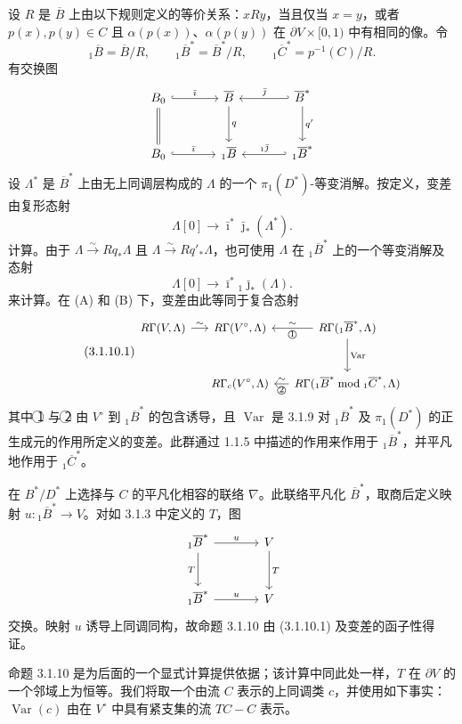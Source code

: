 设 $R$ 是 $\overline B$ 上由以下规则定义的等价关系：$xRy$，当且仅当 $x=y$，或者 $p(x),p(y)\in C$ 且 $\alpha(p(x))$、$\alpha(p(y))$ 在 $\partial V\times[0,1)$ 中有相同的像。令
\[
{}_1\overline B=\overline B/R,
\qquad
{}_1\overline B^*=\overline B^*/R,
\qquad
{}_1\overline C^*=p^{-1}(C)/R.
\]
有交换图
\[
\begin{tikzcd}[column sep=large,row sep=large]
B_0 \arrow[r,hook,"\bar\imath"] \arrow[d,equal]
  & \overline B \arrow[d,"q"]
  & \overline B^* \arrow[l,hook',"\bar\jmath"'] \arrow[d,"q'"] \\
B_0 \arrow[r,hook,"\bar\imath"]
  & {}_1\overline B
  & {}_1\overline B^* \arrow[l,hook',"{}_1\bar\jmath"']
\end{tikzcd}
\]
设 $\Lambda^*$ 是 $\overline B^*$ 上由无上同调层构成的 $\Lambda$ 的一个 $\pi_1(D^*)$-等变消解。按定义，变差由复形态射
\[
\Lambda[0]\longrightarrow
\bar\imath^*\bar\jmath_*(\Lambda^*).
\]
计算。由于 $\Lambda\xrightarrow{\sim}Rq_*\Lambda$ 且 $\Lambda\xrightarrow{\sim}Rq'_*\Lambda$，也可使用 $\Lambda$ 在 ${}_1\overline B^*$ 上的一个等变消解及态射
\[
\Lambda[0]\longrightarrow
\bar\imath^*{}_1\bar\jmath_*(\Lambda).
\]
来计算。在 (A) 和 (B) 下，变差由此等同于复合态射
\begin{equation}\tag{3.1.10.1}
\begin{tikzcd}[column sep=small,row sep=large,cells={nodes={font=\small}}]
R\Gamma(V,\Lambda) \arrow[r,"\sim"]
  & R\Gamma(V^\circ,\Lambda)
  & R\Gamma({}_1\overline B^*,\Lambda)
      \arrow[l,"\sim"',"\text{\textcircled{1}}"]
      \arrow[d,"\operatorname{Var}"] \\
{}
  & R\Gamma_c(V^\circ,\Lambda)
  & R\Gamma({}_1\overline B^*\bmod{}_1\overline C^*,\Lambda)
      \arrow[l,"\sim"',"\text{\textcircled{2}}"]
\end{tikzcd}
\end{equation}
其中 \textcircled{1} 与 \textcircled{2} 由 $V^\circ$ 到 ${}_1\overline B^*$ 的包含诱导，且 $\operatorname{Var}$ 是 3.1.9 对 ${}_1\overline B^*$ 及 $\pi_1(D^*)$ 的正生成元的作用所定义的变差。此群通过 1.1.5 中描述的作用来作用于 ${}_1\overline B^*$，并平凡地作用于 ${}_1\overline C^*$。

在 $B^*/D^*$ 上选择与 $C$ 的平凡化相容的联络 $\nabla$。此联络平凡化 $\overline B^*$，取商后定义映射 $u:{}_1\overline B^*\to V$。对如 3.1.3 中定义的 $T$，图
\[
\begin{tikzcd}[column sep=large,row sep=large]
{}_1\overline B^* \arrow[r,"u"] \arrow[d,"T"']
  & V \arrow[d,"T"] \\
{}_1\overline B^* \arrow[r,"u"]
  & V
\end{tikzcd}
\]
交换。映射 $u$ 诱导上同调同构，故命题 3.1.10 由 (3.1.10.1) 及变差的函子性得证。

命题 3.1.10 是为后面的一个显式计算提供依据；该计算中同此处一样，$T$ 在 $\partial V$ 的一个邻域上为恒等。我们将取一个由流 $C$ 表示的上同调类 $c$，并使用如下事实：$\operatorname{Var}(c)$ 由在 $V^\circ$ 中具有紧支集的流 $TC-C$ 表示。

